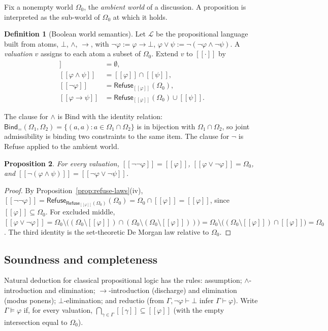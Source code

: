 \documentclass[11pt]{article}
\newcommand{\Refuse}{\mathsf{Refuse}}
\newcommand{\Bind}{\mathsf{Bind}}
\newcommand{\Om}{\Omega}
\newcommand{\sem}[1]{[\![#1]\!]}
\theoremstyle{definition}
\newtheorem{definition}{Definition}[section]
\theoremstyle{plain}
\newtheorem{proposition}[definition]{Proposition}
\theoremstyle{remark}
\begin{document}
Fix a nonempty world $\Om_0$, the \emph{ambient world} of a discussion. A proposition is interpreted as the sub-world of $\Om_0$ at which it holds.

\begin{definition}[Boolean world semantics]\label{def:boolsem}
Let $\mathcal{L}$ be the propositional language built from atoms, $\bot$, $\wedge$, $\to$, with $\neg\varphi:=\varphi\to\bot$, $\varphi\vee\psi:=\neg(\neg\varphi\wedge\neg\psi)$. A \emph{valuation} $v$ assigns to each atom a subset of $\Om_0$. Extend $v$ to $\sem{\cdot}$ by
\begin{align*}
\sem{\bot}&=\emptyset,\\
\sem{\varphi\wedge\psi}&=\sem\varphi\cap\sem\psi,\\
\sem{\neg\varphi}&=\Refuse_{\sem\varphi}(\Om_0),\\
\sem{\varphi\to\psi}&=\Refuse_{\sem\varphi}(\Om_0)\cup\sem\psi .
\end{align*}
\end{definition}

The clause for $\wedge$ is Bind with the identity relation: $\Bind_{=}(\Om_1,\Om_2)=\{(a,a):a\in\Om_1\cap\Om_2\}$ is in bijection with $\Om_1\cap\Om_2$, so joint admissibility is binding two constraints to the same item. The clause for $\neg$ is Refuse applied to the ambient world.

\begin{proposition}\label{prop:boolalg}
For every valuation, $\sem{\neg\neg\varphi}=\sem\varphi$, $\sem{\varphi\vee\neg\varphi}=\Om_0$, and $\sem{\neg(\varphi\wedge\psi)}=\sem{\neg\varphi\vee\neg\psi}$.
\end{proposition}
\begin{proof}
By Proposition~\ref{prop:refuse-laws}(iv), $\sem{\neg\neg\varphi}=\Refuse_{\Refuse_{\sem\varphi}(\Om_0)}(\Om_0)=\Om_0\cap\sem\varphi=\sem\varphi$, since $\sem\varphi\subseteq\Om_0$. For excluded middle, $\sem{\varphi\vee\neg\varphi}=\Om_0\setminus\big((\Om_0\setminus\sem\varphi)\cap(\Om_0\setminus(\Om_0\setminus\sem\varphi))\big)=\Om_0\setminus\big((\Om_0\setminus\sem\varphi)\cap\sem\varphi\big)=\Om_0$. The third identity is the set-theoretic De Morgan law relative to $\Om_0$.
\end{proof}

\subsection{Soundness and completeness}

Natural deduction for classical propositional logic has the rules: assumption; $\wedge$-introduction and elimination; $\to$-introduction (discharge) and elimination (modus ponens); $\bot$-elimination; and reductio (from $\Gamma,\neg\varphi\vdash\bot$ infer $\Gamma\vdash\varphi$). Write $\Gamma\models\varphi$ if, for every valuation, $\bigcap_{\gamma\in\Gamma}\sem\gamma\subseteq\sem\varphi$ (with the empty intersection equal to $\Om_0$).
\end{document}
